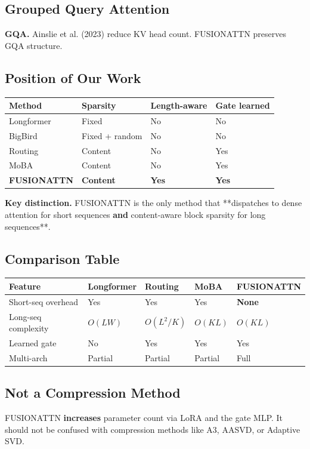 \subsection{Grouped Query Attention}

\textbf{GQA.} Ainslie et al. (2023) reduce KV head count. FUSIONATTN preserves 
GQA structure.

\subsection{Position of Our Work}

\begin{table}[H]
\centering
\small
\begin{tabular}{llll}
\toprule
\textbf{Method} & \textbf{Sparsity} & \textbf{Length-aware} & \textbf{Gate learned} \\
\midrule
Longformer & Fixed & No & No \\
BigBird & Fixed + random & No & No \\
Routing & Content & No & Yes \\
MoBA & Content & No & Yes \\
\textbf{FUSIONATTN} & \textbf{Content} & \textbf{Yes} & \textbf{Yes} \\
\bottomrule
\end{tabular}
\end{table}

\textbf{Key distinction.} FUSIONATTN is the only method that **dispatches to 
dense attention for short sequences\textbf{ and }content-aware block sparsity 
for long sequences**.

\subsection{Comparison Table}

\begin{table}[H]
\centering
\small
\begin{tabular}{lllll}
\toprule
\textbf{Feature} & \textbf{Longformer} & \textbf{Routing} & \textbf{MoBA} & \textbf{FUSIONATTN} \\
\midrule
Short-seq overhead & Yes & Yes & Yes & \textbf{None} \\
Long-seq complexity & $O(LW)$ & $O(L^2/K)$ & $O(KL)$ & $O(KL)$ \\
Learned gate & No & Yes & Yes & Yes \\
Multi-arch & Partial & Partial & Partial & Full \\
\bottomrule
\end{tabular}
\end{table}

\subsection{Not a Compression Method}

FUSIONATTN \textbf{increases} parameter count via LoRA and the gate MLP. It 
should not be confused with compression methods like A3, AASVD, or 
Adaptive SVD.

